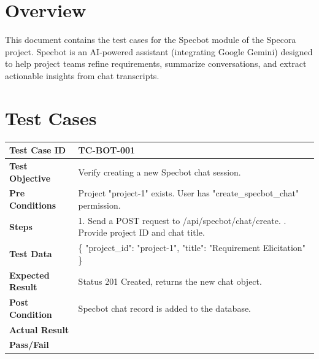 \section{Overview}
This document contains the test cases for the Specbot module of the Specora project. Specbot is an AI-powered assistant (integrating Google Gemini) designed to help project teams refine requirements, summarize conversations, and extract actionable insights from chat transcripts.

\section{Test Cases}

\begin{longtable}{|p{}|p{}|}
\hline
\textbf{Test Case ID} & TC-BOT-001 \\ \hline
\textbf{Test Objective} & Verify creating a new Specbot chat session. \\ \hline
\textbf{Pre Conditions} & Project "project-1" exists. User has "create_specbot_chat" permission. \\ \hline
\textbf{Steps} & 
1. Send a POST request to /api/specbot/chat/create. \newline
2. Provide project ID and chat title. \\ \hline
\textbf{Test Data} & \{ "project_id": "project-1", "title": "Requirement Elicitation" \} \\ \hline
\textbf{Expected Result} & Status 201 Created, returns the new chat object. \\ \hline
\textbf{Post Condition} & Specbot chat record is added to the database. \\ \hline
\textbf{Actual Result} &  \\ \hline
\textbf{Pass/Fail} &  \\ \hline
\end{longtable}

